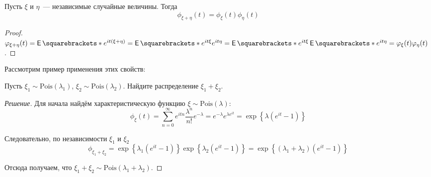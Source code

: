 \begin{property}
	Пусть \(\xi\) и \(\eta\)~--- независимые случайные величины. Тогда
	\[
		\phi_{\xi + \eta}(t) = \phi_{\xi}(t)\phi_{\eta}(t)
	\]
\end{property}
\begin{proof}
	\(\phi_{\xi + \eta}(t) = \E{e^{it(\xi + \eta)}} = \E{e^{it\xi}e^{it\eta}} = \E{e^{it\xi}}\E{e^{it\eta}} = \phi_{\xi}(t)\phi_{\eta}(t)\).
\end{proof}

Рассмотрим пример применения этих свойств:
\begin{problem}
	Пусть \(\xi_1 \sim \mathrm{Pois}(\lambda_1)\), \(\xi_2 \sim \mathrm{Pois}(\lambda_2)\). Найдите распределение \(\xi_1 + \xi_2\).
\end{problem}
\begin{proof}[Решение]
	Для начала найдём характеристическую функцию \(\xi \sim \mathrm{Pois}(\lambda)\):
	\[
		\phi_{\xi}(t) = \sum_{n = 0}^{\infty} 
		e^{itn}\frac{\lambda^n}{n!}e^{-\lambda} = e^{-\lambda}e^{\lambda 
		e^{it}} = \exp\left\{\lambda(e^{it} - 1)\right\}
	\]
	
	Следовательно, по независимости \(\xi_1\) и \(\xi_2\)
	\[
		\phi_{\xi_1 + \xi_2} = \exp\left\{\lambda_1(e^{it} - 1)\right\}\exp\left\{\lambda_2(e^{it} - 1)\right\} = \exp\left\{(\lambda_1 + \lambda_2)(e^{it} - 1)\right\}
	\]
	
	Отсюда получаем, что \(\xi_1 + \xi_2 \sim \mathrm{Pois}(\lambda_1 + \lambda_2)\).
\end{proof}
